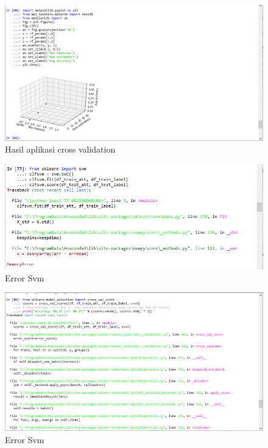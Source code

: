 \begin{figure}[ht]
      \centerline{\includegraphics[width=1\textwidth]
      {figures/cokro/c48}}
      \caption{Hasil aplikasi cross validation}
      \label{c48}
      \end{figure}

\begin{figure}[ht]
      \centerline{\includegraphics[width=1\textwidth]
      {figures/cokro/c49}}
      \caption{Error Svm}
      \label{c49}
      \end{figure}

\begin{figure}[ht]
      \centerline{\includegraphics[width=1\textwidth]
      {figures/cokro/c50}}
      \caption{Error Svm}
      \label{c50}
      \end{figure}

